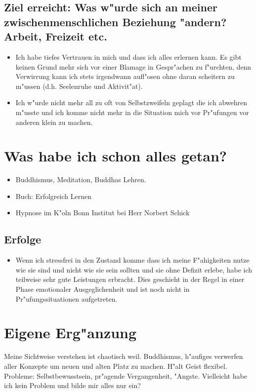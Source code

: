 \documentclass[11pt,a4paper,german]{article}
\begin{document}
\subsection{Ziel erreicht: Was w"urde sich an meiner zwischenmenschlichen Beziehung "andern? Arbeit, Freizeit etc.}
\begin{itemize}
	\item Ich habe tiefes Vertrauen in mich und dass ich alles erlernen kann. Es gibt keinen Grund mehr sich vor einer Blamage in Gespr"achen zu f"urchten, denn Verwirrung kann ich stets irgendwann aufl"osen ohne daran scheitern zu m"ussen (d.h. Seelenruhe und Aktivit"at).
	\item Ich w"urde nicht mehr all zu oft von Selbstzweifeln geplagt die ich abwehren m"usste und ich komme nicht mehr in die Situation mich vor Pr"ufungen vor anderen klein zu machen.	
\end{itemize}

\section{Was habe ich schon alles getan?}
\begin{itemize}
	\item Buddhismus, Meditation, Buddhas Lehren.
	\item Buch: Erfolgreich Lernen
	\item Hypnose im K"oln Bonn Institut bei Herr Norbert Schick
\end{itemize}

\subsection{Erfolge}
	\begin{itemize}
		\item Wenn ich stressfrei in den Zustand komme dass ich meine F"ahigkeiten nutze wie sie sind und nicht wie sie sein sollten und sie ohne Defizit erlebe, habe ich teilweise sehr gute Leistungen erbracht. Dies geschieht in der Regel in einer Phase emotionaler Ausgeglichenheit und ist noch nicht in Pr"ufungssituationen aufgetreten.
	\end{itemize}


\clearpage
\section{Eigene Erg"anzung}
	Meine Sichtweise verstehen ist chaotisch weil. Buddhismus, h"aufiges verwerfen aller Konzepte um neuen und alten Platz zu machen. H"alt Geist flexibel.
	Probleme: Selbstbewusstsein, pr"agende Vergangenheit, "Angste. Vielleicht habe ich kein Problem und bilde mir alles nur ein?
\end{document}
